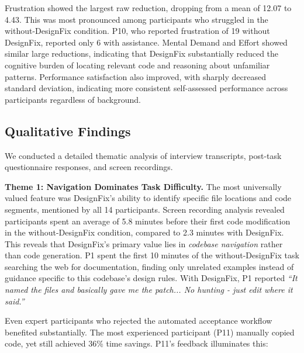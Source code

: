 Frustration showed the largest raw reduction, dropping from a mean of
12.07 to 4.43. This was most pronounced among participants who
struggled in the without-DesignFix condition. P10, who reported frustration
of 19 without DesignFix, reported only 6 with
assistance. Mental Demand and Effort showed similar large reductions, indicating that DesignFix
substantially reduced the cognitive burden of locating relevant code
and reasoning about unfamiliar patterns. Performance satisfaction also
improved, with sharply decreased standard
deviation, indicating more consistent self-assessed
performance across participants regardless of background.

\subsection{Qualitative Findings}
\label{sec:user-study-qualitative}
We conducted a detailed thematic analysis of interview transcripts, post-task questionnaire responses, and screen recordings.

\textbf{Theme 1: Navigation Dominates Task Difficulty.} The most universally valued feature was DesignFix's ability to identify specific file locations and code segments, mentioned by all 14 participants. Screen recording analysis revealed participants spent an average of 5.8 minutes before their first code modification in the without-DesignFix condition, compared to 2.3 minutes with DesignFix.
This reveals that DesignFix's primary value lies in \textit{codebase navigation} rather than code generation. P1 spent the first 10 minutes of the without-DesignFix task searching the web for documentation, finding only unrelated examples instead of guidance specific to this codebase's design rules.
With DesignFix, P1 reported 
\textit{``It named the files and basically gave me the patch... No hunting - just edit where it said.''} 


Even expert participants who rejected the automated acceptance workflow benefited substantially. The most experienced participant (P11) manually copied code, yet still achieved 36\% time savings. P11's feedback illuminates this:




